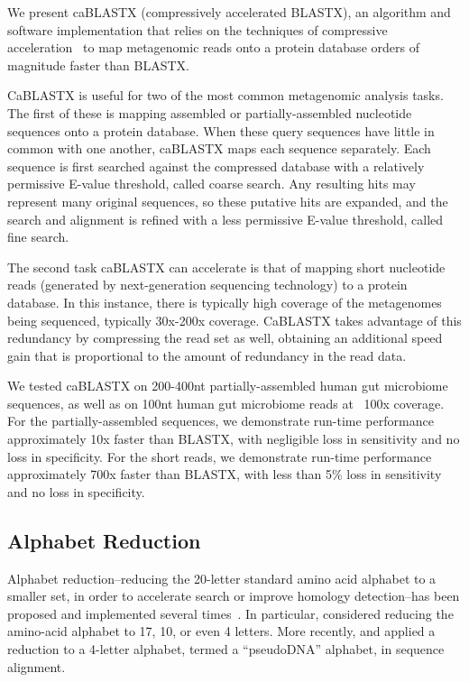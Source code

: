 \documentclass{amsbook}
\theoremstyle{definition}
\theoremstyle{remark}
\numberwithin{equation}{section}
\begin{document}
We present caBLASTX (compressively accelerated BLASTX), an algorithm and 
software implementation that relies on the techniques of compressive 
acceleration~\cite{Loh, Daniels} to map metagenomic reads onto a protein 
database orders of magnitude faster than BLASTX.

CaBLASTX is useful for two of the most common metagenomic analysis tasks. 
The first of these is mapping assembled or partially-assembled
nucleotide sequences onto a protein database. 
When these query sequences have
little in common with one another, caBLASTX maps each sequence separately. 
Each sequence is first searched against the compressed database with a 
relatively permissive E-value threshold, called coarse search. 
Any resulting hits may represent many original sequences, so these putative 
hits are expanded, and the search and alignment is refined with a less 
permissive E-value threshold, called fine search.

The second task caBLASTX can accelerate is that of mapping short nucleotide
reads (generated by next-generation sequencing technology) to a protein
database. In this instance, there is typically high coverage of the metagenomes
being sequenced, typically 30x-200x coverage. CaBLASTX takes advantage of this
redundancy
by compressing the read set as well, obtaining an additional speed gain that is
proportional to the amount of redundancy in the read data.


We tested caBLASTX on 200-400nt partially-assembled human gut microbiome
sequences, as well as on 100nt human gut microbiome reads at ~100x coverage.
For the partially-assembled sequences, we demonstrate run-time performance
approximately 10x faster than BLASTX, with negligible loss in sensitivity and
no loss in specificity. For the short reads, we demonstrate run-time
performance approximately 700x faster than BLASTX, with less than 5\% loss in
sensitivity and no loss in specificity.

\subsection*{Alphabet Reduction}

Alphabet reduction--reducing the 20-letter standard amino acid alphabet to a
smaller set, in order to accelerate search or improve homology detection--has
been proposed and implemented several times~\cite{blah}.
In particular, \citet{Murphy:2000, Peterson:2009} considered reducing the
amino-acid alphabet to 17, 10, or even 4 letters.
More recently, \citet{Zhao:2012} and \citet{Huson:2013} applied a reduction to
a 4-letter alphabet, termed a ``pseudoDNA'' alphabet, in sequence alignment.
\end{document}
